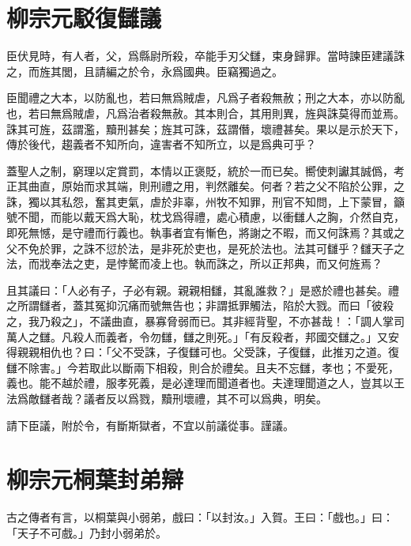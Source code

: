 \section[駁復讎議\quad{\small 柳宗元}]{{\normalsize 柳宗元}\quad 駁復讎議}
臣伏見時，有人者，父，爲縣尉所殺，卒能手刃父讎，束身歸罪。當時諫臣建議誅之，而旌其閭，且請編之於令，永爲國典。臣竊獨過之。

臣聞禮之大本，以防亂也，若曰無爲賊虐，凡爲子者殺無赦；刑之大本，亦以防亂也，若曰無爲賊虐，凡爲治者殺無赦。其本則合，其用則異，旌與誅莫得而並焉。誅其可旌，茲謂濫，黷刑甚矣；旌其可誅，茲謂僭，壞禮甚矣。果以是示於天下，傳於後代，趨義者不知所向，違害者不知所立，以是爲典可乎？

蓋聖人之制，窮理以定賞罰，本情以正褒貶，統於一而已矣。嚮使刺讞其誠僞，考正其曲直，原始而求其端，則刑禮之用，判然離矣。何者？若之父不陷於公罪，之誅，獨以其私怨，奮其吏氣，虐於非辜，州牧不知罪，刑官不知問，上下蒙冒，籲號不聞，而能以戴天爲大恥，枕戈爲得禮，處心積慮，以衝讎人之胸，介然自克，即死無憾，是守禮而行義也。執事者宜有慚色，將謝之不暇，而又何誅焉？其或之父不免於罪，之誅不愆於法，是非死於吏也，是死於法也。法其可讎乎？讎天子之法，而戕奉法之吏，是悖驁而凌上也。執而誅之，所以正邦典，而又何旌焉？

且其議曰：「人必有子，子必有親。親親相讎，其亂誰救？」是惑於禮也甚矣。禮之所謂讎者，蓋其冤抑沉痛而號無告也；非謂抵罪觸法，陷於大戮。而曰「彼殺之，我乃殺之」，不議曲直，暴寡脅弱而已。其非經背聖，不亦甚哉！：「調人掌司萬人之讎。凡殺人而義者，令勿讎，讎之則死。」「有反殺者，邦國交讎之。」又安得親親相仇也？曰：「父不受誅，子復讎可也。父受誅，子復讎，此推刃之道。復讎不除害。」今若取此以斷兩下相殺，則合於禮矣。且夫不忘讎，孝也；不愛死，義也。能不越於禮，服孝死義，是必達理而聞道者也。夫達理聞道之人，豈其以王法爲敵讎者哉？議者反以爲戮，黷刑壞禮，其不可以爲典，明矣。

請下臣議，附於令，有斷斯獄者，不宜以前議從事。謹議。

\section[桐葉封弟辯\quad{\small 柳宗元}]{{\normalsize 柳宗元}\quad 桐葉封弟辯}
古之傳者有言，以桐葉與小弱弟，戲曰：「以封汝。」入賀。王曰：「戲也。」曰：「天子不可戲。」乃封小弱弟於。

